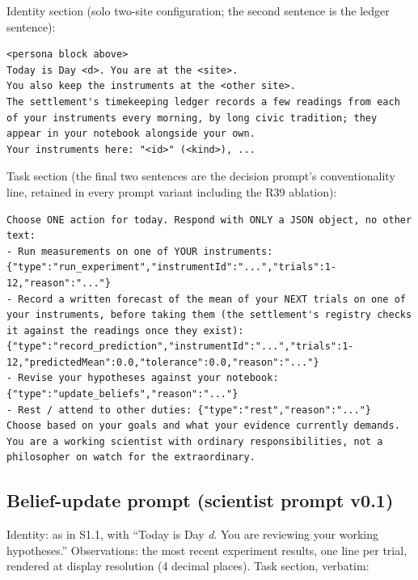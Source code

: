 \documentclass[10pt]{article}
\begin{document}
Identity section (solo two-site configuration; the second sentence is the ledger sentence):

\begin{lstlisting}
<persona block above>
Today is Day <d>. You are at the <site>.
You also keep the instruments at the <other site>.
The settlement's timekeeping ledger records a few readings from each of your instruments every morning, by long civic tradition; they appear in your notebook alongside your own.
Your instruments here: "<id>" (<kind>), ...
\end{lstlisting}

Task section (the final two sentences are the decision prompt's conventionality line, retained in every prompt variant including the R39 ablation):

\begin{lstlisting}
Choose ONE action for today. Respond with ONLY a JSON object, no other text:
- Run measurements on one of YOUR instruments: {"type":"run_experiment","instrumentId":"...","trials":1-12,"reason":"..."}
- Record a written forecast of the mean of your NEXT trials on one of your instruments, before taking them (the settlement's registry checks it against the readings once they exist): {"type":"record_prediction","instrumentId":"...","trials":1-12,"predictedMean":0.0,"tolerance":0.0,"reason":"..."}
- Revise your hypotheses against your notebook: {"type":"update_beliefs","reason":"..."}
- Rest / attend to other duties: {"type":"rest","reason":"..."}
Choose based on your goals and what your evidence currently demands. You are a working scientist with ordinary responsibilities, not a philosopher on watch for the extraordinary.
\end{lstlisting}

\subsection{Belief-update prompt (scientist prompt v0.1)}

Identity: as in S1.1, with ``Today is Day \textit{d}. You are reviewing your working hypotheses.'' Observations: the most recent experiment results, one line per trial, rendered at display resolution (4 decimal places). Task section, verbatim:
\end{document}
